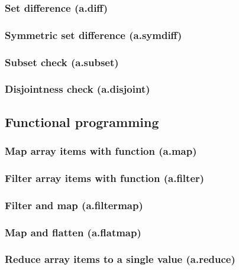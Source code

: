\documentclass{article}
\theoremstyle{definition}
\begin{document}
\subsubsection{Set difference (a.diff)}

\subsubsection{Symmetric set difference (a.symdiff)}

\subsubsection{Subset check (a.subset)}

\subsubsection{Disjointness check (a.disjoint)}

\subsection{Functional programming}

\subsubsection{Map array items with function (a.map)}

\subsubsection{Filter array items with function (a.filter)}

\subsubsection{Filter and map (a.filtermap)}

\subsubsection{Map and flatten (a.flatmap)}

\subsubsection{Reduce array items to a single value (a.reduce)}
\end{document}
